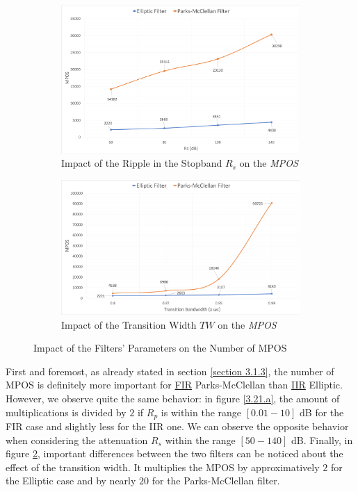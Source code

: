 \newpage

\begin{figure}[ht!] \ContinuedFloat
\centering
	\begin{subfigure}[htb]{\textwidth}
		\centering
		\includegraphics[scale=0.275]{effect_Rs.png}
		\caption{Impact of the Ripple in the Stopband $R_s$ on the \textit{MPOS}}\label{3.21.b}
	\end{subfigure}
\par\bigskip
\centering
\begin{subfigure}[htb]{\textwidth} 
	\centering
	\includegraphics[scale=0.275]{effect_TW.png}
	\caption{Impact of the Transition Width $TW$ on the \textit{MPOS}}\label{3.21.c}
\end{subfigure}
\captionsetup{width=0.95\linewidth}
\caption{Impact of the Filters' Parameters on the Number of MPOS}\label{Figure 3.21}
\end{figure}

First and foremost, as already stated in section \ref{section 3.1.3}, the number of MPOS is definitely more important for \hyperlink{FIR}{FIR} Parks-McClellan than \hyperlink{IIR}{IIR} Elliptic. However, we observe quite the same behavior: in figure \ref{3.21.a}, the amount of multiplications is divided by $2$ if $R_p$ is within the range $[0.01 - 10]$ dB for the FIR case and slightly less for the IIR one. We can observe the opposite behavior when considering the attenuation $R_s$ within the range $[50 - 140]$ dB. Finally, in figure \ref{3.21.c}, important differences between the two filters can be noticed about the effect of the transition width. It multiplies the MPOS by approximatively $2$ for the Elliptic case and by nearly $20$ for the Parks-McClellan filter.

